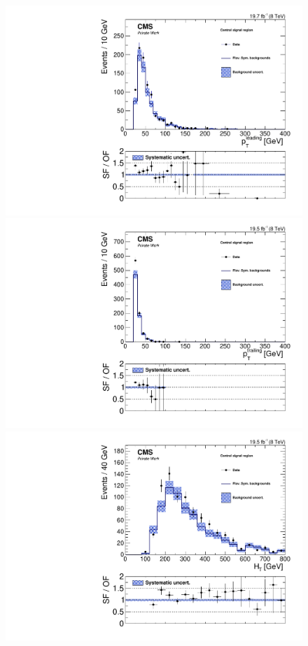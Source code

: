 \begin{figure}[htbp]
\begin{minipage}[t]{0.49\textwidth}
  \includegraphics[width=\textwidth]{plots/results/rSFOFDependencies/rSFOFDependency_SignalCentral_LeadingPt_Full2012_SF_lowMass.pdf}
\end{minipage}
\begin{minipage}[t]{0.49\textwidth}
\includegraphics[width=\textwidth]{plots/results/rSFOFDependencies/rSFOFDependency_SignalCentral_TrailingPt_Full2012_SF_lowMass.pdf}
\end{minipage}
\begin{minipage}[t]{0.49\textwidth}
  \includegraphics[width=\textwidth]{plots/results/rSFOFDependencies/rSFOFDependency_SignalCentral_HT_Full2012_SF_lowMass.pdf}

\end{minipage}
\end{figure}
